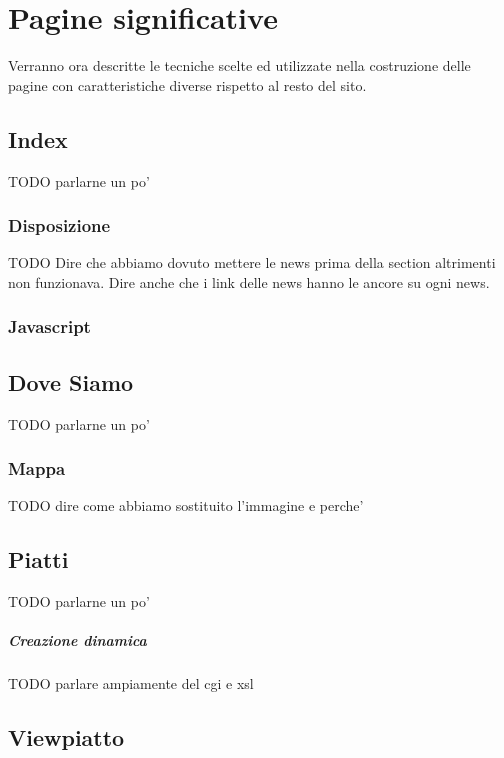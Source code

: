 \documentclass[10pt,a4paper,onecolumn]{article}
\begin{document}
\clearpage

\section{Pagine significative}

Verranno ora descritte le tecniche scelte ed utilizzate nella costruzione delle pagine con caratteristiche diverse rispetto al resto del sito.

\subsection{Index}

TODO parlarne un po'

\subsubsection{Disposizione}

TODO Dire che abbiamo dovuto mettere le news prima della section altrimenti non funzionava. Dire anche che i link delle news hanno le ancore su ogni news.

\subsubsection{Javascript}

\subsection{Dove Siamo}

TODO parlarne un po'

\subsubsection{Mappa}

TODO dire come abbiamo sostituito l'immagine e perche'

\subsection{Piatti}

TODO parlarne un po'

\subparagraph{Creazione dinamica}

TODO parlare ampiamente del cgi e xsl

\subsection{Viewpiatto}
\end{document}
